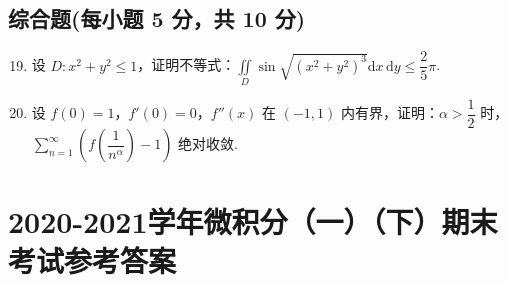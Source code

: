 \documentclass[../Main.tex]{subfiles}
\begin{document}
\section{综合题(每小题 5 分，共 10 分)}

\begin{enumerate}
    \setcounter{enumi}{18}
    \item 设 \( D: x^2 + y^2 \leq 1 \)，证明不等式：\( \displaystyle \iint \limits_D \sin \sqrt{(x^2 + y^2)^3} \mathrm{d}x\,\mathrm{d}y \leq \dfrac{2}{5}\pi \).
          \vspace{10em}

    \item 设 \( f(0) = 1 \)，\( f'(0) = 0 \)，\( f''(x) \) 在 \( (-1,1) \) 内有界，证明：\( \alpha > \dfrac{1}{2} \) 时，\( \sum \limits_{n=1}^{\infty} \left( f\left( \dfrac{1}{n^\alpha} \right) - 1 \right) \) 绝对收敛.
          \vspace{10em}
\end{enumerate}
\chapter{2020-2021学年微积分（一）（下）期末考试参考答案}
\end{document}
